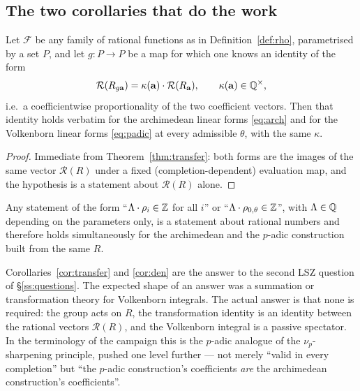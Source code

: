 \subsection{The two corollaries that do the work}\label{ss:corollaries}

\begin{corollary}\label{cor:transfer}
\PROVED{} Let $\mathcal F$ be any family of rational functions as in
Definition~\ref{def:rho}, parametrised by a set $P$, and let $g:P\to P$ be a map for which
one knows an identity of the form
\[
 \mathcal R(R_{g\mathbf a})=\kappa(\mathbf a)\cdot\mathcal R(R_{\mathbf a}),
 \qquad \kappa(\mathbf a)\in\mathbb{Q}^{\times},
\]
i.e.\ a coefficientwise proportionality of the two coefficient vectors. Then that identity
holds verbatim for the archimedean linear forms \eqref{eq:arch} and for the Volkenborn
linear forms \eqref{eq:padic} at every admissible $\theta$, with the same $\kappa$.
\end{corollary}

\begin{proof}
Immediate from Theorem~\ref{thm:transfer}: both forms are the images of the same vector
$\mathcal R(R)$ under a fixed (completion-dependent) evaluation map, and the hypothesis is a
statement about $\mathcal R(R)$ alone.
\end{proof}

\begin{corollary}\label{cor:den}
\PROVED{} Any statement of the form ``$\Lambda\cdot\rho_i\in\mathbb{Z}$ for all $i$'' or
``$\Lambda\cdot\rho_{0,\theta}\in\mathbb{Z}$'', with $\Lambda\in\mathbb{Q}$ depending on the parameters
only, is a statement about rational numbers and therefore holds simultaneously for the
archimedean and the $p$-adic construction built from the same $R$.
\end{corollary}

Corollaries~\ref{cor:transfer} and \ref{cor:den} are the answer to the second LSZ question
of \S\ref{ss:questions}. The expected shape of an answer was a summation or transformation
theory for Volkenborn integrals. The actual answer is that none is required: the group acts
on $R$, the transformation identity is an identity between the rational vectors
$\mathcal R(R)$, and the Volkenborn integral is a passive spectator. In the terminology of
the campaign this is the $p$-adic analogue of the $\nu_p$-sharpening principle, pushed one
level further --- not merely ``valid in every completion'' but ``the $p$-adic
construction's coefficients \emph{are} the archimedean construction's coefficients''.

